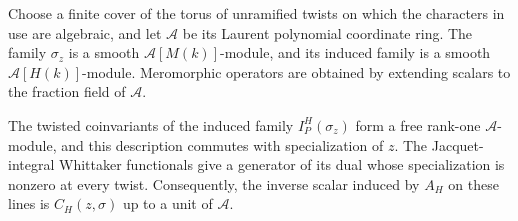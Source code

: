 Choose a finite cover of the torus of unramified twists on which the
characters in use are algebraic, and let $\mathcal A$ be its Laurent
polynomial coordinate ring.  The family $\sigma_z$ is a smooth
$\mathcal A[M(k)]$-module, and its induced family is a smooth
$\mathcal A[H(k)]$-module.  Meromorphic operators are obtained by
extending scalars to the fraction field of $\mathcal A$.

\begin{lemma}
\label{lem:whittaker-family}
The twisted coinvariants of the induced family $I_P^H(\sigma_z)$ form a
free rank-one $\mathcal A$-module, and this description commutes with
specialization of $z$.  The Jacquet-integral Whittaker functionals give a
generator of its dual whose specialization is nonzero at every twist.
Consequently, the inverse scalar induced by $A_H$ on these lines is
$C_H(z,\sigma)$ up to a unit of $\mathcal A$.
\end{lemma}


